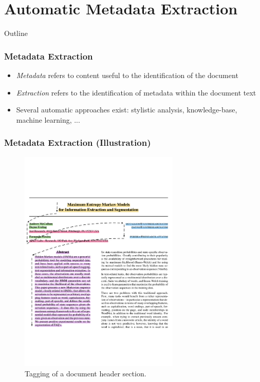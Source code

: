 \documentclass{beamer}
\begin{document}

\section{Automatic Metadata Extraction}


\begin{frame}[noframenumbering]{Outline}
\end{frame}


\begin{frame}
\frametitle{Metadata Extraction}
\begin{itemize}
\item \emph{Metadata} refers to content useful to the identification of the document
\item \emph{Extraction} refers to the identification of metadata within the document text
\item Several automatic approaches exist: stylistic analysis, knowledge-base, machine learning, ...
\end{itemize}
\end{frame}


\begin{frame}
\frametitle{Metadata Extraction (Illustration)}
\begin{figure}[h]
\center
\includegraphics[width=3in]{Figures/extraction.pdf}
\caption{Tagging of a document header section.}
\end{figure}
\end{frame}
\end{document}
